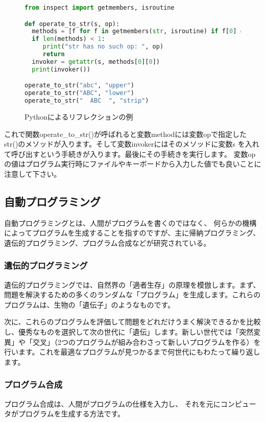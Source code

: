 \documentclass[a4j,dvipdfmx]{jsarticle}
\newcommand{\fixed}[1]{{\ttfamily #1}}
\begin{document}
\begin{figure}[htbp]
\centering
\begin{lstlisting}[language=python]
from inspect import getmembers, isroutine

def operate_to_str(s, op):
  methods = [f for f in getmembers(str, isroutine) if f[0] == op]
  if len(methods) < 1:
     print("str has no such op: ", op)
     return
  invoker = getattr(s, methods[0][0])
  print(invoker())  

operate_to_str("abc", "upper")
operate_to_str("ABC", "lower")
operate_to_str("  ABC  ", "strip")

\end{lstlisting}
\caption{Pythonによるリフレクションの例}
\label{fig:dynamic_gen}
\end{figure}

これで関数{\fixed operate\_to\_str()}が呼ばれると変数{\fixed method}には変数{\fixed op}で指定した
{\fixed str()}のメソッドが入ります。そして変数{\fixed invoker}にはそのメソッドに変数{\fixed s}
を入れて呼び出すという手続きが入ります。最後にその手続きを実行します。
変数{\fixed op}の値はプログラム実行時にファイルやキーボードから入力した値でも良いことに注意して下さい。

\subsection{自動プログラミング}
自動プログラミングとは、人間がプログラムを書くのではなく、
何らかの機構によってプログラムを生成することを指すのですが、主に帰納プログラミング、
遺伝的プログラミング、プログラム合成などが研究されている。

\subsubsection{遺伝的プログラミング}

遺伝的プログラミングでは、自然界の「適者生存」の原理を模倣します。まず、問題を解決するための多くのランダムな「プログラム」を生成します。これらのプログラムは、生物の「遺伝子」のようなものです。

次に、これらのプログラムを評価して問題をどれだけうまく解決できるかを比較し、優秀なものを選択して次の世代に「遺伝」します。新しい世代では「突然変異」や「交叉」（2つのプログラムが組み合わさって新しいプログラムを作る）を行います。これを最適なプログラムが見つかるまで何世代にもわたって繰り返します。

\subsubsection{プログラム合成}
プログラム合成は、人間がプログラムの仕様を入力し、
それを元にコンピュータがプログラムを生成する方法です。
\end{document}
